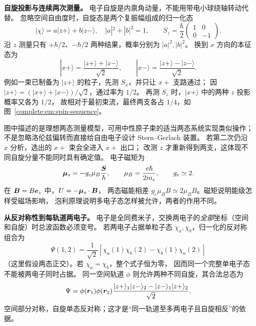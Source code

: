 \noindent\textbf{自旋投影与连续两次测量。}
电子自旋是内禀角动量，不能用带电小球绕轴转动代替。
忽略空间自由度时，自旋态是两个复振幅组成的归一化态
\[
 |\chi\rangle=a|z+\rangle+b|z-\rangle,\quad |a|^2+|b|^2=1,
 \qquad S_z=\frac\hbar2\begin{pmatrix}1&0\\0&-1\end{pmatrix}.
\]
沿 $z$ 测量只有 $+\hbar/2$、$-\hbar/2$ 两种结果，概率分别为 $|a|^2,|b|^2$。
换到 $x$ 方向的本征态为
\[
 |x+\rangle=\frac{|z+\rangle+|z-\rangle}{\sqrt2},\qquad
 |x-\rangle=\frac{|z+\rangle-|z-\rangle}{\sqrt2}.
\]
例如一束已制备为 $|z+\rangle$ 的粒子，先测 $S_x$，并只让 $x+$ 支路通过；
因 $|z+\rangle=(|x+\rangle+|x-\rangle)/\sqrt2$，通过率为 $1/2$。
再测 $S_z$ 时，$|x+\rangle$ 中的两种 $z$ 投影概率又各为 $1/2$，
故相对于最初束流，最终两支各占 $1/4$，如图~\ref{complete:em:spin-sequence}。

\begin{qualityfigure}
\end{qualityfigure}

图中描述的是理想两态测量模型，可用中性原子束的适当两态系统实现类似操作；
不是忽略洛伦兹偏转而直接给自由电子设计 Stern--Gerlach 装置。
若第二次仍沿 $x$ 分析，选出的 $x+$ 束会全进入 $x+$ 出口；
改测 $z$ 才重新得到两支，这体现不同自旋分量不能同时具有确定值。
电子磁矩为
\[
 \bm{\mu}_s=-g_e\mu_B\frac{\bm{S}}{\hbar},\qquad
 \mu_B=\frac{e\hbar}{2m_e},\qquad g_e\simeq2.
\]
在 $\bm{B}=B\bm{e}_z$ 中，$U=-\bm{\mu}_s\cdot\bm{B}$，
两态磁能相差 $g_e\mu_BB\simeq2\mu_BB$。磁矩说明能级怎样受磁场影响，
泡利原理说明多电子态怎样被允许，两者的作用不同。

\noindent\textbf{从反对称性到每轨道两电子。}
电子是全同费米子，交换两电子的\emph{全部}坐标（空间和自旋）时总波函数必须变号。
若两电子占据单粒子态 $\chi_a,\chi_b$，归一化的反对称组合为
\[
 \Psi(1,2)=\frac1{\sqrt2}
 [\chi_a(1)\chi_b(2)-\chi_b(1)\chi_a(2)]
\]
（这里假设两态正交）。若 $\chi_a=\chi_b$，整个式子恒为零，
因而同一个完整单电子态不能被两电子同时占据。
同一空间轨道 $\phi$ 则允许两种不同自旋，其合法总态为
\[
 \Psi=\phi(\bm{r}_1)\phi(\bm{r}_2)
 \frac{|z+\rangle_1|z-\rangle_2-|z-\rangle_1|z+\rangle_2}{\sqrt2}.
\]
空间部分对称，自旋单态反对称；这才是“同一轨道至多两电子且自旋相反”的依据。

